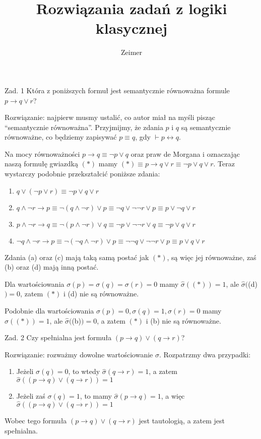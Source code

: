 \documentclass[11pt]{article}
\begin{document}
	\title{Rozwiązania zadań z logiki klasycznej}
	\author{Zeimer}
	\date{}
	\maketitle
	
	\par Zad. 1 Która z poniższych formuł jest semantycznie równoważna formule $p \to q \lor r$?
	\par Rozwiązanie: najpierw musmy ustalić, co autor miał na myśli pisząc ``semantycznie równoważna''. Przyjmijmy, że zdania $p$ i $q$ są semantycznie równoważne, co będziemy zapisywać $p \equiv q$, gdy $\vdash p \leftrightarrow q$.
	\par Na mocy równoważności $p \to q \equiv \neg p \lor q$ oraz praw de Morgana i oznaczając naszą formułę gwiazdką $(*)$ mamy $(*) \equiv p \to q \lor r \equiv \neg p \lor q \lor r$. Teraz wystarczy podobnie przekształcić poniższe zdania:
	\begin{enumerate}[label=(\alph*)]
		\item $q \lor (\neg p \lor r) \equiv \neg p \lor q \lor r$
		\item $q \land \neg r \to p \equiv \neg (q \land \neg r) \lor p \equiv \neg q \lor \neg \neg r \lor p \equiv p \lor \neg q \lor r$
		\item $p \land \neg r \to q \equiv \neg (p \land \neg r) \lor q \equiv \neg p \lor \neg \neg r \lor q \equiv \neg p \lor q \lor r$
		\item $\neg q \land \neg r \to p \equiv \neg (\neg q \land \neg r) \lor p \equiv \neg \neg q \lor \neg \neg r \lor p \equiv p \lor q \lor r$
	\end{enumerate}
	\par Zdania (a) oraz (c) mają taką samą postać jak $(*)$, są więc jej równoważne, zaś (b) oraz (d) mają inną postać.
	\par Dla wartościowania $\sigma(p) = \sigma(q) = \sigma(r) = 0$ mamy $\hat{\sigma}((*)) = 1$, ale $\hat{\sigma}($(d)$) = 0$, zatem $(*)$ i (d) nie są równoważne.
	\par Podobnie dla wartościowania $\sigma(p) = 0, \sigma(q) = 1, \sigma(r) = 0$ mamy $\hat{\sigma}((*)) = 1$, ale $\hat{\sigma}($(b)$) = 0$, a zatem $(*)$ i (b) nie są równoważne.
	
	\newpage
	
	\par Zad. 2 Czy spełnialna jest formuła $(p \to q) \lor (q \to r)$?
	\par Rozwiązanie: rozważmy dowolne wartościowanie $\sigma$. Rozpatrzmy dwa przypadki:
	\begin{enumerate}
		\item Jeżeli $\sigma(q) = 0$, to wtedy $\hat{\sigma}(q \to r) = 1$, a zatem $\hat{\sigma}((p \to q) \lor (q \to r)) = 1$
		\item Jeżeli zaś $\sigma(q) = 1$, to mamy $\hat{\sigma}(p \to q) = 1$, a więc $\hat{\sigma}((p \to q) \lor (q \to r)) = 1$
	\end{enumerate}
	\par Wobec tego formuła $(p \to q) \lor (q \to r)$ jest tautologią, a zatem jest spełnialna.
	
\end{document}
